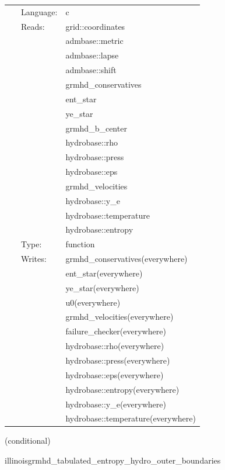  \begin{tabular*}{160mm}{cll} 
~ & Language:  & c \\ 
~ & Reads:  & grid::coordinates \\ 
~& ~ &admbase::metric\\ 
~& ~ &admbase::lapse\\ 
~& ~ &admbase::shift\\ 
~& ~ &grmhd\_conservatives\\ 
~& ~ &ent\_star\\ 
~& ~ &ye\_star\\ 
~& ~ &grmhd\_b\_center\\ 
~& ~ &hydrobase::rho\\ 
~& ~ &hydrobase::press\\ 
~& ~ &hydrobase::eps\\ 
~& ~ &grmhd\_velocities\\ 
~& ~ &hydrobase::y\_e\\ 
~& ~ &hydrobase::temperature\\ 
~& ~ &hydrobase::entropy\\ 
~ & Type:  & function \\ 
~ & Writes:  & grmhd\_conservatives(everywhere) \\ 
~& ~ &ent\_star(everywhere)\\ 
~& ~ &ye\_star(everywhere)\\ 
~& ~ &u0(everywhere)\\ 
~& ~ &grmhd\_velocities(everywhere)\\ 
~& ~ &failure\_checker(everywhere)\\ 
~& ~ &hydrobase::rho(everywhere)\\ 
~& ~ &hydrobase::press(everywhere)\\ 
~& ~ &hydrobase::eps(everywhere)\\ 
~& ~ &hydrobase::entropy(everywhere)\\ 
~& ~ &hydrobase::y\_e(everywhere)\\ 
~& ~ &hydrobase::temperature(everywhere)\\ 
\end{tabular*} 


\vspace{5mm}

   (conditional) 

\hspace{5mm} illinoisgrmhd\_tabulated\_entropy\_hydro\_outer\_boundaries 

\hspace{5mm}{\it entropy+tabulated version of illinoisgrmhd\_outer\_boundaries } 


